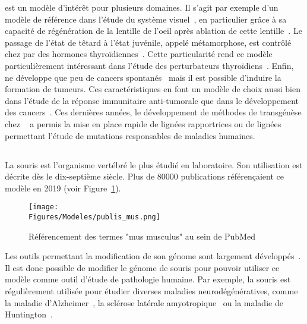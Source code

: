 \documentclass[\main/main.tex]{subfiles}
\begin{document}
%
\xl{} est un modèle d'intérêt pour plusieurs domaines.
%
Il s'agit par exemple d'un modèle de référence dans l'étude du système visuel~\cite{viet_2020,Rahman_2020,kha_2020},
en particulier grâce à sa capacité de régénération de la lentille de l'oeil après ablation de cette lentille~\cite{henry_2019}.
%
Le passage de l'état de têtard à l'état juvénile, appelé métamorphose, est contrôlé chez \xl{} par des hormones thyroïdiennes~\cite{brown_1996,furlow_2006}.
%
Cette particularité rend ce modèle particulièrement intéressant dans l'étude des perturbateurs thyroïdiens~\cite{li_2019,li_2019a,Couderq_2020}.
%
Enfin, \xl{} ne développe que peu de cancers spontanés~\cite{ruben_2007} mais il est possible d'induire la formation de tumeurs. Ces caractéristiques en font un modèle de choix aussi bien dans l'étude de la réponse immunitaire anti-tumorale que dans le développement des cancers~\cite{hardwick_2015}.
%
 Ces dernières années, le développement de méthodes de transgénèse chez \xl{}~\cite{tandon_2017} a permis la mise en place rapide de lignées rapportrices ou de lignées permettant l'étude de mutations responsables de maladies humaines.

    \subsection{\mm}

La souris est l'organisme vertébré le plus étudié en laboratoire.
%
Son utilisation  est décrite dès le dix-septième siècle.
%
Plus de 80000 publications référençaient ce modèle en 2019 (voir Figure~\ref{fig:model:mm:stats}).

\begin{figure}[htbp]{\textwidth} 
    \centering
       \centering \texttt{[image: \\Figures/Modeles/publis\_mus.png]}
       \caption{
            \label{fig:model:mm:stats}Référencement des termes "mus musculus" au sein de PubMed
            }
\end{figure}

%
Les outils permettant la modification de son génome sont largement développés~\cite{lanigan_2020}.
%
Il est donc possible de modifier le génome de souris pour pouvoir utiliser ce modèle comme outil d'étude de pathologie humaine.
%
Par exemple, la souris est régulièrement utilisée pour étudier diverses maladies neurodégénératives,
comme la maladie d'Alzheimer~\cite{han_2020,thadathil_2020,shin_2020},
la sclérose latérale amyotropique~\cite{Ahmed_2020,konopka_2020,mcleod_2020}
ou la maladie de Huntington~\cite{deng_2020,dridi_2020,pfister_2020}.
%
\end{document}
